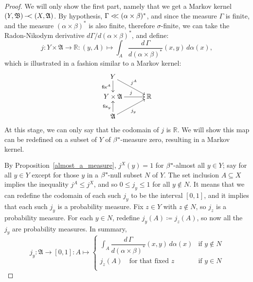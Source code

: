 \documentclass[
twoside=true,
paper=letter,
fontsize=9pt,
pagesize=auto,
leqno,
openany,
headsepline,
overfullrule,
]{scrbook}
\theoremstyle{plain}
\theoremstyle{plain}
\theoremstyle{definition}
\theoremstyle{bfnoteitalic}
\theoremstyle{bfnoteroman}
\newcommand{\sigalg}[1]{\mathfrak{#1}}
\newcommand{\definedby}{\coloneqq}
\newcommand{\sfop}[1]{\mathsf{#1}}
\newcommand{\textsigma}{\hbox{\large{$\sigma$}}\kern-1pt}
\newcommand{\R}{\mathbb{R}}
\newcommand{\sigmaalgebra}{\sigalg{A}}
\newcommand{\sigmaalgebraii}{\sigalg{B}}
\newcommand{\kernast}{\ast\kern-1pt}
\newcommand{\funcj}{j}
\newcommand{\measurespace}{X}
\newcommand{\measurespaceii}{Y}
\newcommand{\mspaceelt}{x}
\newcommand{\mspaceeltii}{y}
\newcommand{\mspaceeltiii}{z}
\newcommand{\abscont}{\mathrel{< \kern-3.5pt <}}
\newcommand{\seti}{A}
\newcommand{\fixinthefirst}[1]{\sfop{fix}_{#1}}
\newcommand{\fixinthesecond}[1]{\sfop{fix}^{#1}}
\newcommand{\transition}{\,-\kern-6pt <}
\newcommand{\measonprod}{\Gamma}%
\newcommand{\marginalone}{\alpha}%
\newcommand{\marginaltwo}{\beta}%
\begin{document}
\begin{proof}
We will only show the first part, namely that we get a Markov kernel
$(\measurespaceii,\sigmaalgebraii)\transition (\measurespace,\sigmaalgebra)$.
By hypothesis,
$\measonprod \abscont (\marginalone\times\marginaltwo)^*$, and since the measure
$\measonprod$ is finite, and the measure $(\marginalone\times\marginaltwo)^*$ is also finite, therefore \textsigma\hyp{}finite, we can take the Radon-Nikodym derivative
$d\measonprod / d(\marginalone\times\marginaltwo)^*$, and define:
\[
\funcj
:\measurespaceii\times\sigmaalgebra\to \R
:(\mspaceeltii,\seti)\mapsto
\int_\seti
\dfrac{d\,\measonprod}{d(\marginalone\times\marginaltwo)^*}
(\mspaceelt,\mspaceeltii)\, d\marginalone(\mspaceelt),
\]
which is illustrated in a fashion similar to a Markov kernel:
\[
\xymatrix@R=16pt@C=30pt{
\measurespaceii
\ar[d]_-{\fixinthesecond{\seti}}
\ar[dr]^{\funcj^\seti} &
\\
\measurespaceii\times\sigmaalgebra \ar[r]^{\funcj} & \R
\\
\sigmaalgebra
\ar[ur]_{\funcj_\mspaceeltii}
\ar[u]^{\fixinthefirst{\mspaceeltii}} &
\\
}
\]
At this stage, we can only say that the codomain of $\funcj$ is $\R$.
We will show this map can be redefined on a subset of $\measurespaceii$ of
$\marginaltwo^\kernast$\hyp{}measure zero, resulting in a  Markov kernel.

By Proposition~\ref{almost_a_measure},
$j^\measurespace(\mspaceeltii) = 1$
for $\marginaltwo^\kernast$\hyp{}almost all  $\mspaceeltii\in\measurespaceii$; say for all
$\mspaceeltii\in\measurespaceii$ except for  those
$\mspaceeltii$ in a $\marginaltwo^\kernast$\hyp{}null subset $N$ of
$\measurespaceii$.
The set inclusion
$\seti\subseteq\measurespace$
implies the inequality
$\funcj^\seti \leq
\funcj^\measurespace$,
and so $0 \leq \funcj_\mspaceeltii \leq 1$ for all $\mspaceeltii \notin N$.
It means that we can redefine the codomain of each such $\funcj_\mspaceeltii$ to be the interval $[0,1]$, and it implies that each such $\funcj_\mspaceeltii$ is a probability measure.
Fix $\mspaceeltiii\in\measurespaceii$ with $\mspaceeltiii\notin N$, so $\funcj_\mspaceeltiii$ is a probability measure. For each
$\mspaceeltii \in N$,
redefine
$\funcj_\mspaceeltii(\seti)
\definedby
\funcj_\mspaceeltiii(\seti)$,
so now all the $\funcj_\mspaceeltii$ are probability measures.
In summary,
\[
\funcj_\mspaceeltii
:\sigmaalgebra \to [0,1]
:\seti \mapsto
\begin{cases}
\displaystyle \int_\seti
\dfrac{d\,\measonprod}{d(\marginalone\times\marginaltwo)^*}
(\mspaceelt,\mspaceeltii)\, d\marginalone(\mspaceelt)
& \text{if $\mspaceeltii\notin N$}
\\
\funcj_\mspaceeltiii(\seti) \quad\text{for that fixed $\mspaceeltiii$}
& \text{if $\mspaceeltii \in N$}
\\
\end{cases}
\]


\end{proof}
\end{document}
